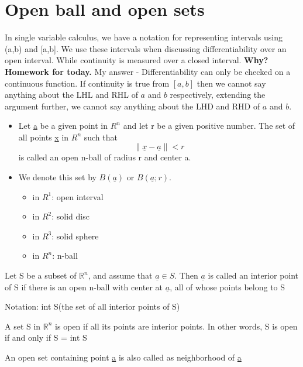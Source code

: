 \documentclass[twoside]{report}
\begin{document}
\section{Open ball and open sets}
\begin{note}
In single variable calculus, we have a notation for representing intervals using (a,b) and [a,b]. We use these intervals when discussing differentiability over an open interval. While continuity is measured over a closed interval. \textbf{Why? Homework for today.}
My answer - Differentiability can only be checked on a continuous function. If continuity is true from $[a,b]$ then we cannot say anything about the LHL and RHL of $a$ and $b$ respectively, extending the argument further, we cannot say anything about the LHD and RHD of $a$ and $b$.
\end{note}

\begin{itemize}
   \item Let \underline{a} be a given point in $R^n$ and let r be a given positive number. The set of all points \underline{x} in $R^n$ such that
      \[
	 \|\underline{x} - \underline{a}\| < r
      \]
 is called an open n-ball of radius r and center a.
\item We denote this set by $B(\underline{a})$ or $B(\underline{a};r)$.
   \begin{itemize}
 \item in $R^1$: open interval 
\item in $R^2$: solid disc
\item in $R^3$: solid sphere
\item in $R^n$: n-ball
   \end{itemize}
\end{itemize}
\begin{definition}
   Let S be a subset of $\mathbb{R}^n$, and assume that $\underline{a} \in S$. Then $\underline{a}$ is called an interior point of S if there is an open n-ball with center at $\underline{a}$, all of whose points belong to S

   Notation: int S(the set of all interior points of S)
\end{definition}
\begin{definition}
   A set S in $\mathbb{R}^n$ is open if all its points are interior points. In other words, S is open if and only if S = int S
\end{definition}
An open set containing point \underline{a} is also called as neighborhood of \underline{a}
\end{document}
